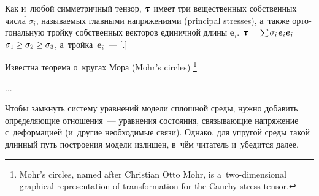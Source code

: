 \begin{otherlanguage}{russian}

Как и~любой симметричный тензор, $\cauchystress$ имеет три вещественных собственных числ\'{а} $\sigma_i$, называемых главными напряжениями (principal stresses), а~также ортогональную тройку собственных векторов единичной длины $\bm{e}_i$.
 ${\cauchystress = \sum \hspace{-0.16ex} \sigma_i \hspace{.16ex} \bm{e}_i \bm{e}_i}$   ${\sigma_1 \hspace{-0.1ex} \geq \sigma_2 \geq \sigma_3}$, а~тройка~${\bm{e}_i}$~--- [.]

Известна теорема о~кругах Мора (Mohr’s circles)%
\footnote{Mohr’s circles, named after Christian Otto Mohr, is a~two-dimensional graphical representation of transformation for the Cauchy stress tensor.}

...



Чтобы замкнуть систему уравнений модели сплошной среды, нужно добавить определяющие отношения~--- уравнения состояния, связывающие напряжение с~деформацией (и~другие необходимые связи). Однако, для упругой среды такой длинный путь построения модели излишен, в~чём читатель и~убедится далее.

\end{otherlanguage}



\label{para:virtualworkprinciple.elastic}



